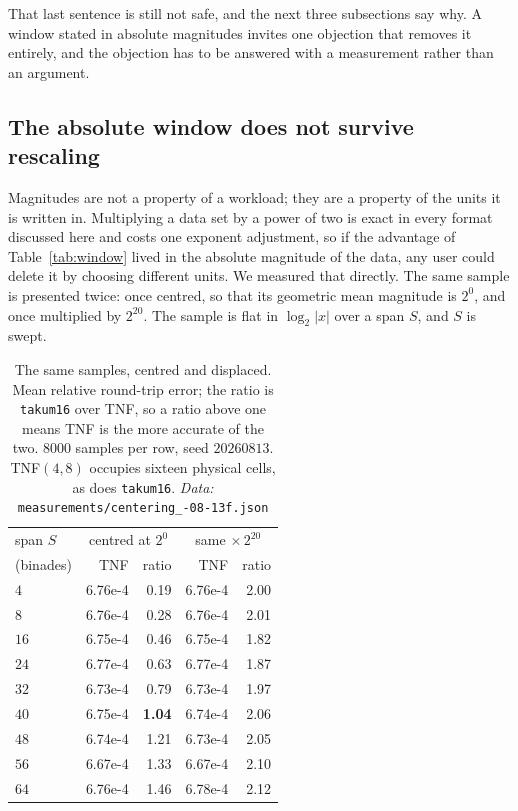 That last sentence is still not safe, and the next three subsections say why. A
window stated in absolute magnitudes invites one objection that removes it
entirely, and the objection has to be answered with a measurement rather than an
argument.

\subsection{The absolute window does not survive rescaling}
\label{sec:centring}

Magnitudes are not a property of a workload; they are a property of the units it
is written in. Multiplying a data set by a power of two is exact in every format
discussed here and costs one exponent adjustment, so if the advantage of
Table~\ref{tab:window} lived in the absolute magnitude of the data, any user could
delete it by choosing different units. We measured that directly. The same sample
is presented twice: once centred, so that its geometric mean magnitude is $2^0$,
and once multiplied by $2^{20}$. The sample is flat in $\log_2|x|$ over a span
$S$, and $S$ is swept.

\begin{table}[htbp]\centering
\caption{The same samples, centred and displaced. Mean relative round-trip error;
the ratio is \texttt{takum16} over TNF, so a ratio above one means TNF is the more
accurate of the two. $8000$ samples per row, seed $20260813$. TNF$(4,8)$ occupies
sixteen physical cells, as does \texttt{takum16}. \emph{Data:} \texttt{measurements/\allowbreak centering\_-08-13f.json}}
\label{tab:centring}
\begin{tabular}{lrrrr}
\hline
span $S$ & \multicolumn{2}{c}{centred at $2^0$} & \multicolumn{2}{c}{same $\times\,2^{20}$} \\
(binades) & TNF & ratio & TNF & ratio \\
\hline
$4$ & 6.76e-4 & 0.19 & 6.76e-4 & 2.00 \\
$8$ & 6.76e-4 & 0.28 & 6.76e-4 & 2.01 \\
$16$ & 6.75e-4 & 0.46 & 6.75e-4 & 1.82 \\
$24$ & 6.77e-4 & 0.63 & 6.77e-4 & 1.87 \\
$32$ & 6.73e-4 & 0.79 & 6.73e-4 & 1.97 \\
$40$ & 6.75e-4 & \textbf{1.04} & 6.74e-4 & 2.06 \\
$48$ & 6.74e-4 & 1.21 & 6.73e-4 & 2.05 \\
$56$ & 6.67e-4 & 1.33 & 6.67e-4 & 2.10 \\
$64$ & 6.76e-4 & 1.46 & 6.78e-4 & 2.12 \\
\hline
\end{tabular}
\end{table}

